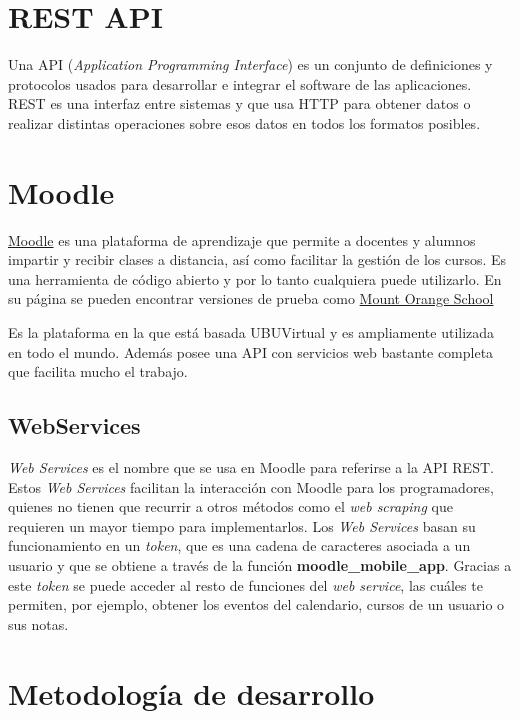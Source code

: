 
\section{REST API}

Una API \cite{noauthor_API_nodate}(\textit{Application Programming Interface}) es un conjunto de definiciones y protocolos usados para desarrollar e integrar el software de las aplicaciones. REST \cite{noauthor_REST_nodate} es una interfaz entre sistemas y que usa HTTP para obtener datos o realizar distintas operaciones sobre esos datos en todos los formatos posibles.

\section{Moodle}

\href{https://moodle.org/}{Moodle} es una plataforma de aprendizaje que permite a docentes y alumnos impartir y recibir clases a distancia, así como facilitar la gestión de los cursos. Es una herramienta de código abierto y por lo tanto cualquiera puede utilizarlo. En su página se pueden encontrar versiones de prueba como \href{https://school.moodledemo.net/}{Mount Orange School}

Es la plataforma en la que está basada UBUVirtual y es ampliamente utilizada en todo el mundo. Además posee una API con servicios web bastante completa que facilita mucho el trabajo.

\subsection{WebServices}

\textit{Web Services} es el nombre que se usa en Moodle para referirse a la API REST. Estos \textit{Web Services} facilitan la interacción con Moodle para los programadores, quienes no tienen que recurrir a otros métodos como el \textit{web scraping} que requieren un mayor tiempo para implementarlos. Los \textit{Web Services} basan su funcionamiento en un \textit{token}, que es una cadena de caracteres asociada a un usuario y que se obtiene a través de la función \textbf{moodle\_mobile\_app}. Gracias a este \textit{token} se puede acceder al resto de funciones del \textit{web service}, las cuáles te permiten, por ejemplo, obtener los eventos del calendario, cursos de un usuario o sus notas.

\section{Metodología de desarrollo}

